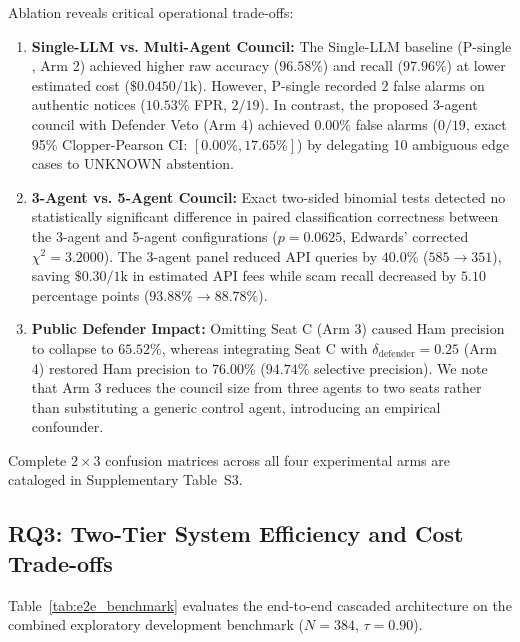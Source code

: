 Ablation reveals critical operational trade-offs:
\begin{enumerate}
    \item \textbf{Single-LLM vs. Multi-Agent Council:} The Single-LLM baseline ($\text{P-single}$, Arm 2) achieved higher raw accuracy ($96.58\%$) and recall ($97.96\%$) at lower estimated cost ($\$0.0450/1\text{k}$). However, P-single recorded $2$ false alarms on authentic notices ($10.53\%$ FPR, $2/19$). In contrast, the proposed 3-agent council with Defender Veto (Arm 4) achieved $0.00\%$ false alarms ($0/19$, exact 95\% Clopper-Pearson CI: $[0.00\%, 17.65\%]$) by delegating 10 ambiguous edge cases to UNKNOWN abstention.
    \item \textbf{3-Agent vs. 5-Agent Council:} Exact two-sided binomial tests detected no statistically significant difference in paired classification correctness between the 3-agent and 5-agent configurations ($p = 0.0625$, Edwards' corrected $\chi^2 = 3.2000$). The 3-agent panel reduced API queries by $40.0\%$ ($585 \to 351$), saving $\$0.30/1\text{k}$ in estimated API fees while scam recall decreased by $5.10$ percentage points ($93.88\% \to 88.78\%$).
    \item \textbf{Public Defender Impact:} Omitting Seat C (Arm 3) caused Ham precision to collapse to $65.52\%$, whereas integrating Seat C with $\delta_{\text{defender}} = 0.25$ (Arm 4) restored Ham precision to $76.00\%$ ($94.74\%$ selective precision). We note that Arm 3 reduces the council size from three agents to two seats rather than substituting a generic control agent, introducing an empirical confounder.
\end{enumerate}

Complete $2 \times 3$ confusion matrices across all four experimental arms are cataloged in Supplementary Table~S3.

\subsection{RQ3: Two-Tier System Efficiency and Cost Trade-offs}
\label{subsec:res_rq3}

Table~\ref{tab:e2e_benchmark} evaluates the end-to-end cascaded architecture on the combined exploratory development benchmark ($N=384$, $\tau=0.90$).

